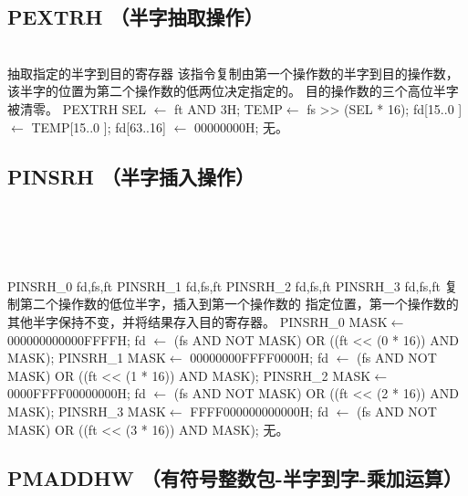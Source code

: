 \subsection{PEXTRH （半字抽取操作）}

\begin{instructionblk}
   \\
  {抽取指定的半字到目的寄存器}
  {该指令复制由第一个操作数的半字到目的操作数，
  该半字的位置为第二个操作数的低两位决定指定的。
  目的操作数的三个高位半字被清零。}
  {PEXTRH \narrownewline
  SEL $\leftarrow$ ft AND 3H; \narrownewline
  TEMP$\leftarrow$ fs >> (SEL * 16); \narrownewline
  fd[15..0 ] $\leftarrow$ TEMP[15..0 ]; \narrownewline
  fd[63..16] $\leftarrow$ 00000000H;}
  {无。}
\end{instructionblk}

\subsection{PINSRH （半字插入操作）}

\begin{instructionblk}
   \\
   \\
   \\
   \\
  \instructionbody
  {PINSRH\_0 fd,fs,ft \narrownewline PINSRH\_1 fd,fs,ft \narrownewline PINSRH\_2 fd,fs,ft \narrownewline PINSRH\_3 fd,fs,ft}
  {}
  {复制第二个操作数的低位半字，插入到第一个操作数的
  指定位置，第一个操作数的其他半字保持不变，并将结果存入目的寄存器。}
  {PINSRH\_0 \narrownewline
  MASK$\leftarrow$ 000000000000FFFFH; \narrownewline
  fd  $\leftarrow$ (fs AND NOT MASK) OR ((ft << (0 * 16)) AND MASK); \narrownewline
  PINSRH\_1 \narrownewline
  MASK$\leftarrow$ 00000000FFFF0000H; \narrownewline
  fd  $\leftarrow$ (fs AND NOT MASK) OR ((ft << (1 * 16)) AND MASK); \narrownewline
  PINSRH\_2 \narrownewline
  MASK$\leftarrow$ 0000FFFF00000000H; \narrownewline
  fd  $\leftarrow$ (fs AND NOT MASK) OR ((ft << (2 * 16)) AND MASK); \narrownewline
  PINSRH\_3 \narrownewline
  MASK$\leftarrow$ FFFF000000000000H; \narrownewline
  fd  $\leftarrow$ (fs AND NOT MASK) OR ((ft << (3 * 16)) AND MASK);}
  {无。}
\end{instructionblk}

\subsection{PMADDHW （有符号整数包-半字到字-乘加运算）}


